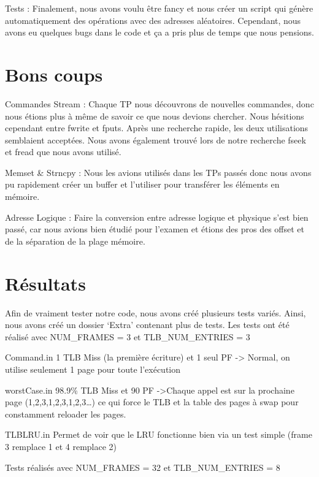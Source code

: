 \documentclass{article}
\begin{document}
\par
Tests : Finalement, nous avons voulu être fancy et nous créer un script qui génère automatiquement des opérations avec des adresses aléatoires. Cependant, nous avons eu quelques bugs dans le code et ça a pris plus de temps que nous pensions. 

\section {Bons coups}
\par
Commandes Stream : Chaque TP nous découvrons de nouvelles commandes, donc nous étions plus à même de savoir ce que nous devions chercher. Nous hésitions cependant entre fwrite et fputs. Après une recherche rapide, les deux utilisations semblaient acceptées. Nous avons également trouvé lors de notre recherche fseek et fread que nous avons utilisé.


\par
Memset \& Strncpy : Nous les avions utilisés dans les TPs passés donc nous avons pu rapidement créer un buffer et l’utiliser pour transférer les éléments en mémoire.


\par
Adresse Logique : Faire la conversion entre adresse logique et physique s’est bien passé, car nous avions bien étudié pour l’examen et étions des pros des offset et de la séparation de la plage mémoire.


\par
\section{Résultats}
Afin de vraiment tester notre code, nous avons créé plusieurs tests variés. Ainsi, nous avons créé un dossier ‘Extra’ contenant plus de tests. Les tests ont été réalisé avec  NUM\_FRAMES = 3 et  TLB\_NUM\_ENTRIES = 3

Command.in
1 TLB Miss (la première écriture) et 1 seul PF -> Normal, on utilise seulement 1 page pour toute l’exécution

worstCase.in
98.9\% TLB Miss et 90 PF ->Chaque appel est sur la prochaine page (1,2,3,1,2,3,1,2,3…) ce qui force le TLB et la table des pages à swap pour constamment reloader les pages.

TLBLRU.in
Permet de voir que le LRU fonctionne bien via un test simple (frame 3 remplace 1 et 4 remplace 2)


Tests réalisés avec NUM\_FRAMES = 32 et   TLB\_NUM\_ENTRIES = 8
\end{document}
